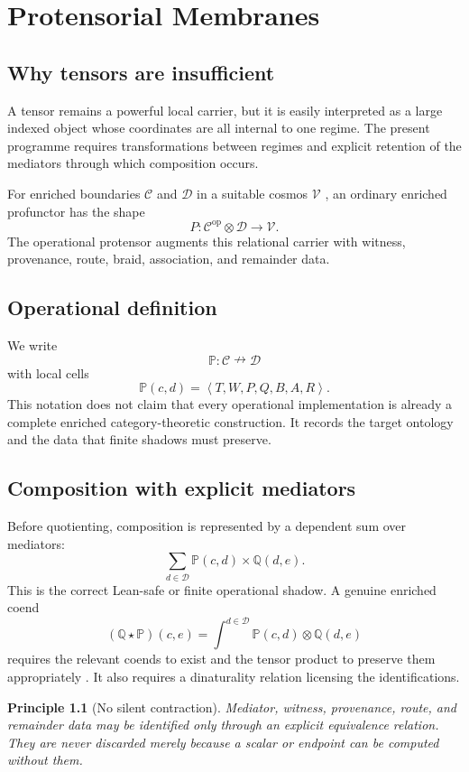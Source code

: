 \documentclass[12pt,openany]{book}
\newtheorem{principle}[definition]{Principle}
\theoremstyle{remark}
\newcommand{\Protensor}{\mathbb P}
\newcommand{\typedtuple}[1]{\left\langle #1 \right\rangle}
\begin{document}
\chapter{Protensorial Membranes}
\label{ch:protensor}

\section{Why tensors are insufficient}
A tensor remains a powerful local carrier, but it is easily interpreted as a large indexed object whose coordinates are all internal to one regime. The present programme requires transformations between regimes and explicit retention of the mediators through which composition occurs.

For enriched boundaries $\mathcal C$ and $\mathcal D$ in a suitable cosmos $\mathcal V$ \cite{Kelly}, an ordinary enriched profunctor has the shape
\[
P:\mathcal C^{\mathrm{op}}\otimes\mathcal D\to\mathcal V.
\]
The operational protensor augments this relational carrier with witness, provenance, route, braid, association, and remainder data.

\section{Operational definition}
We write
\[
\Protensor:\mathcal C\nrightarrow\mathcal D
\]
with local cells
\[
\Protensor(c,d)
=
\typedtuple{T,W,P,Q,B,A,R}.
\]
This notation does not claim that every operational implementation is already a complete enriched category-theoretic construction. It records the target ontology and the data that finite shadows must preserve.

\section{Composition with explicit mediators}
Before quotienting, composition is represented by a dependent sum over mediators:
\[
\sum_{d\in\mathcal D}
\Protensor(c,d)\times\mathbb Q(d,e).
\]
This is the correct Lean-safe or finite operational shadow. A genuine enriched coend
\[
(\mathbb Q\star\Protensor)(c,e)
=
\int^{d\in\mathcal D}
\Protensor(c,d)\otimes\mathbb Q(d,e)
\]
requires the relevant coends to exist and the tensor product to preserve them appropriately \cite{Loregian}. It also requires a dinaturality relation licensing the identifications.

\begin{principle}[No silent contraction]
Mediator, witness, provenance, route, and remainder data may be identified only through an explicit equivalence relation. They are never discarded merely because a scalar or endpoint can be computed without them.
\end{principle}
\end{document}
